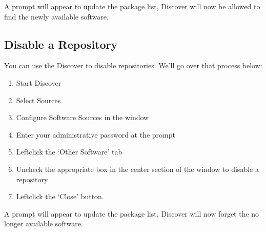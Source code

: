 \documentclass[letterpaper,10pt,english]{sphinxmanual}
\begin{document}
\sphinxAtStartPar
A prompt will appear to update the package list, Discover will now be allowed to find the newly available software.


\subsection{Disable a Repository}
\label{\detokenize{docs/repositories:disable-a-repository}}
\sphinxAtStartPar
You can use the Discover to disable repositories. We’ll go over that process below:
\begin{enumerate}
%
\item {} 
\sphinxAtStartPar
Start Discover

\item {} 
\sphinxAtStartPar
Select Sources

\item {} 
\sphinxAtStartPar
Configure Software Sources in the window

\item {} 
\sphinxAtStartPar
Enter your administrative password at the prompt

\item {} 
\sphinxAtStartPar
Left\sphinxhyphen{}click the ‘Other Software’ tab

\item {} 
\sphinxAtStartPar
Uncheck the appropriate box in the center section of the window to disable a repository

\item {} 
\sphinxAtStartPar
Left\sphinxhyphen{}click the ‘Close’ button.

\end{enumerate}

\sphinxAtStartPar
A prompt will appear to update the package list, Discover will now forget the no longer available software.
\end{document}
